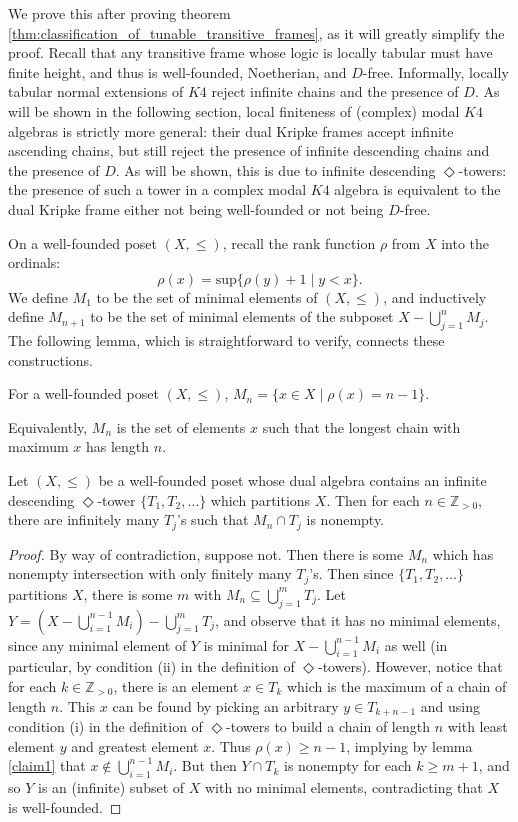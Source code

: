 \documentclass[submission]{eptcs}
\begin{document}
We prove this after proving theorem \ref{thm:classification_of_tunable_transitive_frames}, as it will greatly simplify the proof.
Recall that any transitive frame whose logic is locally tabular must have finite height, and thus is well-founded, Noetherian, and $D$-free. Informally, locally tabular normal extensions of $K4$ reject infinite chains and the presence of $D$.
As will be shown in the following section, local finiteness of (complex) modal $K4$ algebras is strictly more general: their dual Kripke frames accept infinite ascending chains, but still reject the presence of infinite descending chains and the presence of $D$.
As will be shown, this is due to infinite descending $\Diamond$-towers: the presence of such a tower in a complex modal $K4$ algebra is equivalent to the dual Kripke frame either not being well-founded or not being $D$-free.
\par
On a well-founded poset $(X,\leq)$, recall the rank function $\rho$ from $X$ into the ordinals:
\[
\rho(x)=\text{sup}\{\rho(y)+1\mid y < x\}.
\] 
We define $M_1$ to be the set of minimal elements of $(X,\leq)$, and inductively define $M_{n+1}$ to be the set of minimal elements of the subposet $X-\bigcup_{j=1}^nM_j$. 
The following lemma, which is straightforward to verify, connects these constructions.
\begin{lemma}\label{claim1}
    For a well-founded poset $(X,\leq)$, $M_n=\{x \in X \mid \rho(x)=n-1\}$.
\end{lemma}

Equivalently, $M_n$ is the set of elements $x$ such that the longest chain with maximum $x$ has length $n$.

\begin{lemma}\label{claim2}
    Let $(X,\leq)$ be a well-founded poset whose dual algebra contains an infinite descending $\Diamond$-tower $\{T_1,T_2,\dots\}$ which partitions $X$. 
    Then for each $n \in \mathbb{Z}_{>0}$, there are infinitely many $T_j$'s such that $M_n\cap T_j$ is nonempty.
\end{lemma}

\begin{proof}
    By way of contradiction, suppose not. Then there is some $M_n$ which has nonempty intersection with only finitely many $T_j$'s. Then since $\{T_1,T_2,\dots\}$ partitions $X$, there is some $m$ with $M_n \subseteq \bigcup_{j=1}^m T_j$.
    Let $Y=(X-\bigcup_{i=1}^{n-1} M_i)-\bigcup_{j=1}^mT_j$, and observe that it has no minimal elements, since any minimal element of 
    $Y$ is minimal for $X-\bigcup_{i=1}^{n-1} M_i$ as well (in particular, by condition (ii) in the definition of $\Diamond$-towers). 
    However, notice that for each $k\in \mathbb{Z}_{>0}$, there is an element $x\in T_{k}$ which is the maximum of a chain of length $n$.
    This $x$ can be found by picking an arbitrary $y \in T_{k+n-1}$ and using condition (i) in the definition of $\Diamond$-towers to build a chain of length $n$ with least element $y$ and greatest element $x$.
    Thus $\rho(x)\geq n-1$, implying by lemma \ref{claim1} that $x \notin\bigcup_{i=1}^{n-1}M_i$. 
    But then $Y \cap T_k$ is nonempty for each $k\geq m+1$, and so $Y$ is an (infinite) subset of $X$ with no minimal elements, contradicting that $X$ is well-founded.
\end{proof}
\end{document}
